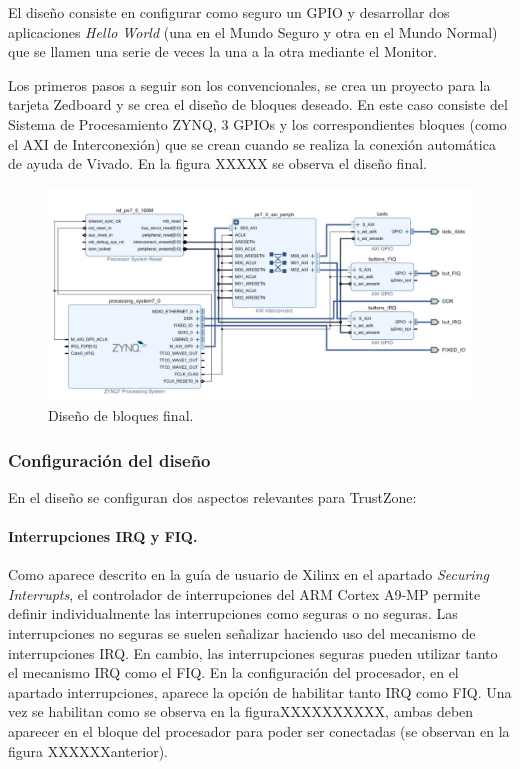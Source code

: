 El diseño consiste en configurar como seguro un GPIO y desarrollar dos aplicaciones \textit{Hello World} (una en el Mundo Seguro y otra en el Mundo Normal) que se llamen una serie de veces la una a la otra mediante el Monitor.\newline

Los primeros pasos a seguir son los convencionales, se crea un proyecto para la tarjeta Zedboard y se crea el diseño de bloques deseado. En este caso consiste del Sistema de Procesamiento ZYNQ, 3 GPIOs y los correspondientes bloques (como el AXI de Interconexión) que se crean cuando se realiza la conexión automática de ayuda de Vivado. En la figura XXXXX se observa el diseño final. \newline

\begin{figure}
	\centering
	\includegraphics[width=1\textwidth]{imagenes/blockdesign.jpg}
	\caption{\label{fig1}Diseño de bloques final.}
\end{figure}

\subsubsection{Configuración del diseño}

En el diseño se configuran dos aspectos relevantes para TrustZone:

\paragraph{Interrupciones IRQ y FIQ.}
Como aparece descrito en la guía de usuario de Xilinx \cite{guiaxilinx} en el apartado \textit{Securing Interrupts}, el controlador de interrupciones del ARM Cortex A9-MP permite definir individualmente las interrupciones como seguras o no seguras. Las interrupciones no seguras se suelen señalizar haciendo uso del mecanismo de interrupciones IRQ. En cambio, las interrupciones seguras pueden utilizar tanto el mecanismo IRQ como el FIQ. En la configuración del procesador, en el apartado interrupciones, aparece la opción de habilitar tanto IRQ como FIQ. Una vez se habilitan como se observa en la figuraXXXXXXXXXX, ambas deben aparecer en el bloque del procesador para poder ser conectadas (se observan en la figura XXXXXXanterior). \newline


